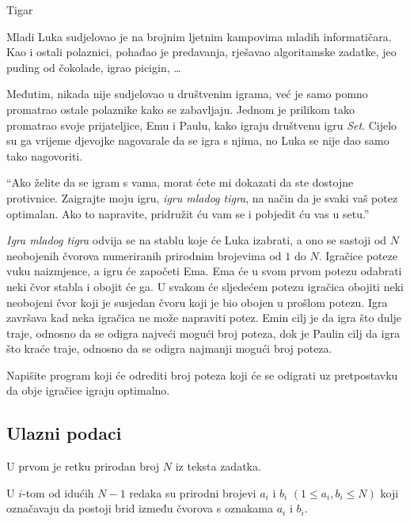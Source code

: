 \begin{statement}[
  problempoints=100,
  timelimit=1 sekunda,
  memorylimit=512 MiB,
]{Tigar}

Mladi Luka sudjelovao je na brojnim ljetnim kampovima mladih informatičara.
Kao i ostali polaznici, pohađao je predavanja, rješavao algoritamske zadatke,
jeo puding od čokolade, igrao picigin, \ldots

Međutim, nikada nije sudjelovao u društvenim igrama, već je samo pomno
promatrao ostale polaznike kako se zabavljaju. Jednom je prilikom tako
promatrao svoje prijateljice, Emu i Paulu, kako igraju društvenu igru
\textit{Set}. Cijelo su ga vrijeme djevojke nagovarale da se igra s njima,
no Luka se nije dao samo tako nagovoriti.

``Ako želite da se igram s vama, morat ćete mi dokazati da ste dostojne
  protivnice. Zaigrajte moju igru, \textit{igru mladog tigra}, na način da je
  svaki vaš potez optimalan. Ako to napravite, pridružit ću vam se i pobjedit ću
  vas u setu.''

\textit{Igra mladog tigra} odvija se na stablu koje će Luka izabrati, a ono se
sastoji od $N$ neobojenih čvorova numeriranih prirodnim brojevima od $1$ do
$N$. Igračice poteze vuku naizmjence, a igru će započeti Ema. Ema će u svom
prvom potezu odabrati neki čvor stabla i obojit će ga. U svakom će sljedećem
potezu igračica obojiti neki neobojeni čvor koji je susjedan čvoru koji je
bio obojen u prošlom potezu. Igra završava kad neka igračica ne može
napraviti potez. Emin cilj je da igra što dulje traje, odnosno da se odigra
najveći mogući broj poteza, dok je Paulin cilj da igra što kraće traje,
odnosno da se odigra najmanji mogući broj poteza.

Napišite program koji će odrediti broj poteza koji će se odigrati uz
pretpostavku da obje igračice igraju optimalno.

\subsection*{Ulazni podaci}

U prvom je retku prirodan broj $N$ iz teksta zadatka.

U $i$-tom od idućih $N - 1$ redaka su prirodni brojevi $a_i$ i $b_i$
$(1 \le a_i, b_i \le N)$ koji označavaju da postoji brid između čvorova
s oznakama $a_i$ i $b_i$.


\end{statement}
